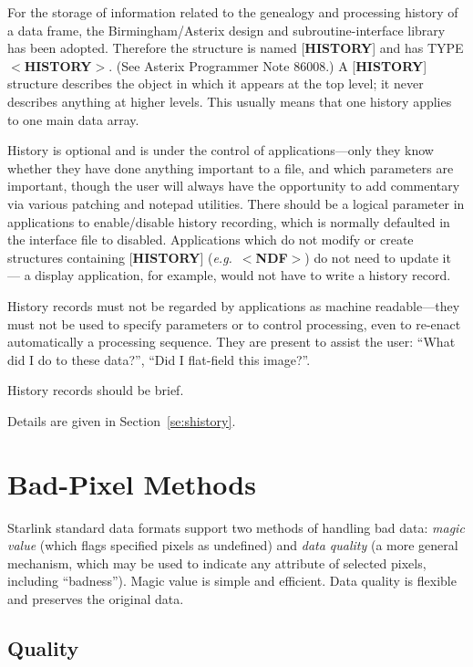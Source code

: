 \documentclass[twoside,11pt]{article}
\newcommand{\htmlref}[2]{#1}
\newcommand{\html}[1]{}
\newcommand{\latex}[1]{#1}
\newcommand{\xlabel}[1]{}
\renewcommand{\_}{\texttt{\symbol{95}}}
\begin{document}
For the storage of information related to the genealogy and
processing history of a data frame, the
Birmingham/Asterix design and subroutine-interface library
has been adopted.  Therefore the structure is named
{[}{\bf HISTORY}{]} and has TYPE $<${\bf HISTORY}$>$.  (See
Asterix Programmer Note 86\_008.)
A {[}{\bf HISTORY}{]} structure describes
the object in which it appears at the top level;
it never describes anything at higher levels.
This usually means that one history applies to one
main data array.

History is optional and is under the control of applications---only
they know whether they have done anything important to a file, and which
parameters are important, though the user will always
have the opportunity to add commentary via various patching
and notepad utilities.  There
should be a logical parameter in applications to enable/disable history
recording, which is normally defaulted in the interface file to
disabled.  Applications which do not modify or create structures containing
{[}{\bf HISTORY}{]} ({\it e.g.}\ 
$<${\bf NDF}$>$) do not need to update it ---
a display
application, for example, would not have to write a history
record.

History records must not be regarded by applications as
machine readable---they must not be used to specify parameters
or to control processing, even to re-enact automatically
a processing sequence.  They are present to assist the user:
``What did I do to these data?'', ``Did I flat-field this image?''.

History records should be brief.

Details are given in \latex{Section~\ref{se:shistory}.}\html{\htmlref{$<${\bf HISTORY}$>$
Structure.}{se:history}}

\section{\xlabel{se_badpixel}Bad-Pixel Methods\label{se:badpixel}}

Starlink standard data formats support two
methods of handling bad data: {\it magic value} (which
flags specified pixels as undefined)
and {\it data quality} (a more general mechanism, which may
be used to indicate any attribute of selected pixels, including
``badness'').  Magic value is simple
and efficient.  Data quality
is flexible and preserves the original data.

\subsection{\xlabel{se_quality}Quality\label{se:quality}}
\end{document}
